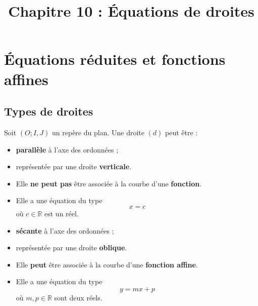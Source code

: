 \documentclass[11pt]{article}
\title{Chapitre 10 : Équations de droites}
\date{}
\author{}
\begin{document}
\maketitle\thispagestyle{fancy}

\section{Équations réduites et fonctions affines}
\subsection{Types de droites}
\noindent Soit $(O; I, J)$ un repère du plan. Une droite $(d)$ peut être
:\\[2mm]
\begin{minipage}[]{.5\textwidth}
  \begin{itemize}
    \item \textbf{parallèle} à l'axe des ordonnées ;
  \end{itemize}
\begin{center}
\end{center}
\begin{itemize}
  \item représentée par une droite \textbf{verticale}.
  \item Elle \textbf{ne peut pas} être associée à la courbe d'une
    \textbf{fonction}.
  \item Elle a une équation du type
    \[
      x = c
    \]
    où $c\in\mathbb{R}$ est un réel.
\end{itemize}
\end{minipage}
\begin{minipage}[]{.5\textwidth}
  \begin{itemize}
    \item \textbf{sécante} à l'axe des ordonnées ;
  \end{itemize}
\begin{center}
\end{center}
\begin{itemize}
  \item représentée par une droite \textbf{oblique}.
  \item Elle \textbf{peut} être associée à la courbe d'une
    \textbf{fonction affine}.
  \item Elle a une équation du type
    \[
      y = mx+p
    \]
    où $m,p\in\mathbb{R}$ sont deux réels.
\end{itemize}
\end{minipage}
\end{document}
